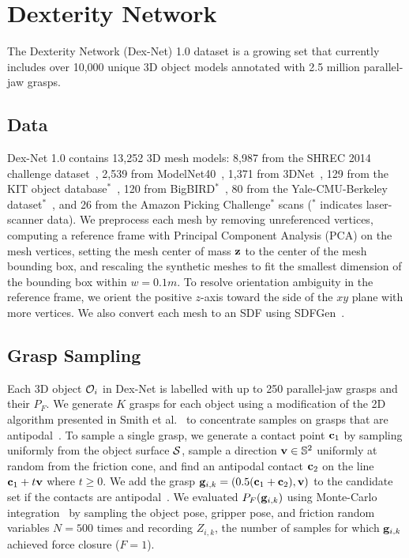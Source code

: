 \section{Dexterity Network}

The Dexterity Network (Dex-Net) 1.0 dataset is a growing set that currently includes over 10,000 unique 3D object models annotated with 2.5 million parallel-jaw grasps.

\subsection{Data}
Dex-Net 1.0 contains 13,252 3D mesh models: 8,987 from the SHREC 2014 challenge dataset~\cite{li2015comparison}, 2,539 from ModelNet40~\cite{wu20153d}, 1,371 from 3DNet~\cite{wohlkinger20123dnet}, 129 from the KIT object database$^*$~\cite{kasper2012kit}, 120 from BigBIRD$^*$~\cite{singh2014bigbird}, 80 from the Yale-CMU-Berkeley dataset$^*$~\cite{calli2015benchmarking}, and 26 from the Amazon Picking Challenge$^*$ scans ($^*$ indicates laser-scanner data).
We preprocess each mesh by removing unreferenced vertices, computing a reference frame with Principal Component Analysis (PCA) on the mesh vertices, setting the mesh center of mass $\mathbf{z}$ to the center of the mesh bounding box, and rescaling the synthetic meshes to fit the smallest dimension of the bounding box within $w = 0.1m$.
To resolve orientation ambiguity in the reference frame, we orient the positive $z$-axis toward the side of the $xy$ plane with more vertices. 
We also convert each mesh to an SDF using SDFGen~\cite{sdfgen}.

\subsection{Grasp Sampling}
Each 3D object $\mathcal{O}_i$ in Dex-Net is labelled with up to 250 parallel-jaw grasps and their $P_F$.
We generate $K$ grasps for each object using a modification of the 2D algorithm presented in Smith et al.~\cite{smith1999computing} to concentrate samples on grasps that are antipodal~\cite{mahler2015gp}.
To sample a single grasp, we generate a contact point $\mathbf{c}_1$ by sampling uniformly from the object surface $\mathcal{S}$, sample a direction $\mathbf{v} \in \mathbb{S}^2$ uniformly at random from the friction cone, and find an antipodal contact $\mathbf{c}_2$ on the line $\mathbf{c}_1 + t\mathbf{v}$ where $t \geq 0$.
We add the grasp $\mathbf{g}_{i,k} = (0.5(\mathbf{c}_1 + \mathbf{c}_2), \mathbf{v})$ to the candidate set if the contacts are antipodal~\cite{mahler2015gp}.
We evaluated $P_F(\mathbf{g}_{i,k})$ using Monte-Carlo integration~\cite{kehoe2012toward, weisz2012pose} by sampling the object pose, gripper pose, and friction random variables $N=500$ times and recording $Z_{i,k}$, the number of samples for which $\mathbf{g}_{i,k}$ achieved force closure ($F=1$).


